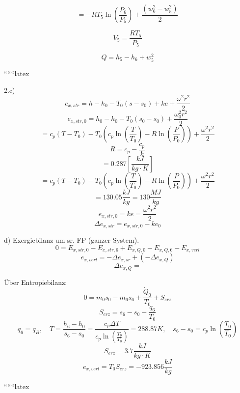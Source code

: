 \[
= -RT_5 \ln \left( \frac{P_6}{P_5} \right) + \frac{(w_6^2 - w_5^2)}{2}
\]

\[
V_5 = \frac{RT_5}{P_5}
\]

\[
Q = h_5 - h_6 + w_5^2
\]

``````latex


2.c) \\
\[
e_{x,str} = h - h_0 - T_0(s - s_0) + ke + \frac{\omega^2 r^2}{2}
\]
\[
e_{x,str,0} = h_0 - h_0 - T_0(s_0 - s_0) + \frac{\omega_0^2 r^2}{2}
\]
\[
= c_p (T - T_0) - T_0 \left( c_p \ln \left( \frac{T}{T_0} \right) - R \ln \left( \frac{P}{P_0} \right) \right) + \frac{\omega^2 r^2}{2}
\]
\[
R = c_p - \frac{c_p}{k}
\]
\[
= 0.287 \left[ \frac{kJ}{kg \cdot K} \right]
\]
\[
= c_p \left( T - T_0 \right) - T_0 \left( c_p \ln \left( \frac{T}{T_0} \right) - R \ln \left( \frac{P}{P_0} \right) \right) + \frac{\omega^2 r^2}{2}
\]
\[
= 130.05 \frac{kJ}{kg} = 130 \frac{MJ}{kg}
\]
\[
e_{x,str,0} = ke = \frac{\omega^2 r^2}{2}
\]
\[
\Delta e_{x,str} = e_{x,str,0} - ke_0
\]

d) Exergiebilanz um sr. FP (ganzer System). \\
\[
0 = E_{x,str,0} - E_{x,str,6} + E_{x,Q,0} - E_{x,Q,6} - E_{x,verl}
\]
\[
e_{x,verl} = -\Delta e_{x,sr} + (-\Delta e_{x,Q})
\]
\[
\Delta e_{x,Q} =
\]

Über Entropiebilanz: \\
\[
0 = \dot{m}_0 s_0 - \dot{m}_6 s_6 + \frac{\dot{Q}_0}{T_0} + S_{erz}
\]
\[
S_{erz} = s_6 - s_0 - \frac{q_6}{T_0}
\]
\[
q_6 = q_B, \quad T = \frac{h_6 - h_0}{s_6 - s_0} = \frac{c_p \Delta T}{c_p \ln \left( \frac{T_0}{T_0} \right)} = 288.87 K, \quad s_6 - s_0 = c_p \ln \left( \frac{T_0}{T_0} \right)
\]
\[
S_{erz} = 3.7 \frac{kJ}{kg \cdot K}
\]
\[
e_{x,verl} = T_0 S_{erz} = -923.856 \frac{kJ}{kg}
\]

``````latex


